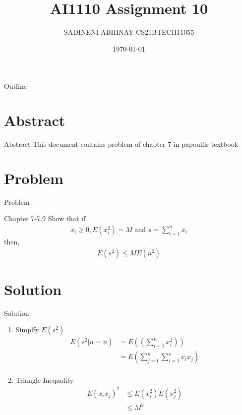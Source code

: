 \documentclass{beamer}
\title{AI1110 Assignment 10}
\author{SADINENI ABHINAY-CS21BTECH11055 }
\date{\today}
\providecommand{\e}[1]{\ensuremath{E\left(#1\right)}}
\providecommand{\brak}[1]{\ensuremath{\left(#1\right)}}
\newcounter{saveenumi}
\newcommand{\seti}{\setcounter{saveenumi}{\value{enumi}}}
\begin{document}
\newcommand{\BEQA}{\begin{eqnarray}}
\newcommand{\EEQA}{\end{eqnarray}}
\newcommand{\define}{\stackrel{\triangle}{=}}
\newcommand*\circled[1]{\tikz[baseline=(char.base)]{
    \node[shape=circle,draw,inner sep=2pt] (char) {#1};}}

	\begin{frame}
		\titlepage
	\end{frame}
\begin{frame}{Outline}
\tableofcontents
\end{frame}

\section{Abstract}
\begin{frame}{Abstract}
This document contains problem of chapter 7 in papoullis textbook
\end{frame}
\section{Problem}
\begin{frame}{Problem}
\begin{block}{Chapter 7-7.9}
Show that if 
	\begin{align}
		x_i \ge 0 , \e{x_i^2}=M \text{ and } s=\sum_{i=1}^{n} x_i
	\end{align}
	then,
	\begin{align}
		\e{s^2} \le M\e{n^2}
	\end{align}
\end{block}
\end{frame}
\section{Solution}
\begin{frame}{Solution}
	\begin{enumerate}
	\item Simplfy $\e{s^2}$
\begin{align}
	\e{s^2|n=n}&=\e{\brak{\sum_{i=1}^{n} x_i^2}} \\
	     &=\e{\sum_{j=1}^n\sum_{i=1}^n x_i x_j} \\
	       \end{align}
		\item Triangle Inequality 
			\begin{align}
				\e{x_i x_j}^2 &\le \e{x_i^2}\e{x_j^2}  \\
				             &\le  M^2 
					\end{align}
					\seti
	\end{enumerate}
\end{frame}
\end{document}

